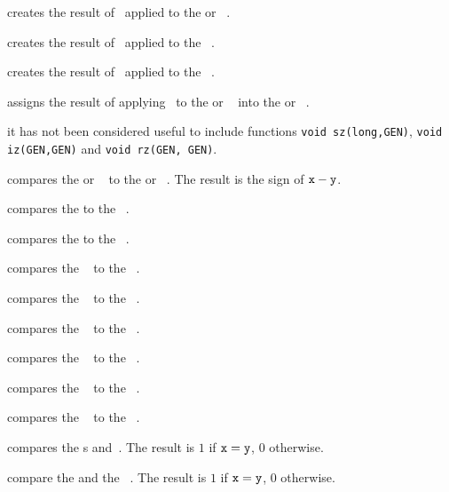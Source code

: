 creates the result of \op\ applied to the
 or ~.

 creates the result of \op\ applied to the
~.

 creates the result of \op\ applied to the
~.

 assigns the result of applying \op\ to the
 or ~ into the  or ~.

 it has not been considered useful to include
functions {\tt void \op sz(long,GEN)}, {\tt void \op iz(GEN,GEN)} and
{\tt void \op rz(GEN, GEN)}.
\smallskip


 compares the  or ~
to the  or ~. The result is the sign of
${\tt x}-{\tt y}$.

 compares the   to the
~.

 compares the   to the
~.

 compares the ~ to the
~.

 compares the ~ to the
~.

 compares the ~ to the
~.

 compares the ~ to the
~.

 compares the ~ to the
~.

 compares the ~ to the
~.

 compares the s  and~.
The result is $1$ if ${\tt x} = {\tt y}$, $0$ otherwise.


 compare the   and 
the ~. The result is $1$ if ${\tt x} = {\tt y}$, $0$ otherwise.


